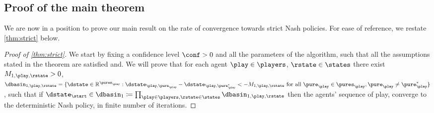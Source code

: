 \subsection{Proof of the main theorem}

We are now in a position to prove our main result on the rate of convergence towards strict Nash policies.
For ease of reference, we restate \cref{thm:strict} below.

\strict*

\begin{proof}[Proof of \cref{thm:strict}]

We start by fixing a confidence level $\conf>0$ and all the parameters of the algorithm, such that all the assumptions stated in the theorem are satisfied and. We will prove that for each agent $\play\in\players$, $\rstate\in\states$ there exist $M_{1,\play,\rstate}>0$, $\dbasin_{1,\play,\rstate} = \braces{\dstate\in \R^{\pures_\play}: \dstate_{\play,\pure_\play} -\dstate_{\play,\pure^{*}_{\play}}<-M_{1,\play,\rstate} \text{ for all } \pure_\play\in\pures_\play, \pure_\play\neq\pure_{\play}^*}$,  such that if $\dstate_{\start}\in\dbasin_1 \defeq \prod_{\play\in\players,\rstate\in\states}\dbasin_{1,\play,\rstate}$  then the agents' sequence of play, converge to the deterministic Nash policy, in finite number of iterations. 


\end{proof}
